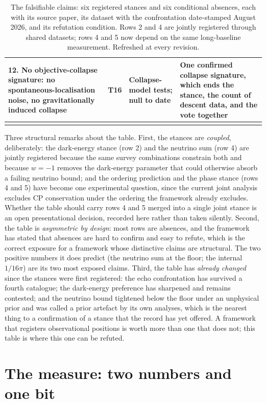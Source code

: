 \documentclass[11pt]{article}
\theoremstyle{definition}
\begin{document}
\begin{longtable}{p{} p{} p{} p{}}
12. No objective-collapse signature: no spontaneous-localisation noise, no gravitationally induced collapse & T16 & Collapse-model tests; null to date & One confirmed collapse signature, which ends the stance, the count of descent data, and the vote together \\
\bottomrule
\caption{The falsifiable claims: six registered stances and six conditional absences, each with its source paper, its dataset with the confrontation date-stamped August 2026, and its refutation condition. Rows 2 and 4 are jointly registered through shared datasets; rows 4 and 5 now depend on the same long-baseline measurement. Refreshed at every revision.}
\label{tab:stances}
\end{longtable}
\endgroup

Three structural remarks about the table. First, the stances are \emph{coupled}, deliberately: the dark-energy stance (row 2) and the neutrino sum (row 4) are jointly registered because the same survey combinations constrain both and because $w = -1$ removes the dark-energy parameter that could otherwise absorb a failing neutrino bound; and the ordering prediction and the phase stance (rows 4 and 5) have become one experimental question, since the current joint analysis excludes CP conservation under the ordering the framework already excludes. Whether the table should carry rows 4 and 5 merged into a single joint stance is an open presentational decision, recorded here rather than taken silently. Second, the table is \emph{asymmetric by design}: most rows are absences, and the framework has stated that absences are hard to confirm and easy to refute, which is the correct exposure for a framework whose distinctive claims are structural. The two positive numbers it does predict (the neutrino sum at the floor; the internal $1/16\pi$) are its two most exposed claims. Third, the table has \emph{already changed} since the stances were first registered: the echo confrontation has survived a fourth catalogue; the dark-energy preference has sharpened and remains contested; and the neutrino bound tightened below the floor under an unphysical prior and was called a prior artefact by its own analyses, which is the nearest thing to a confirmation of a stance that the record has yet offered. A framework that registers observational positions is worth more than one that does not; this table is where this one can be refuted.


\section{The measure: two numbers and one bit}\label{sec:measure}
\end{document}
